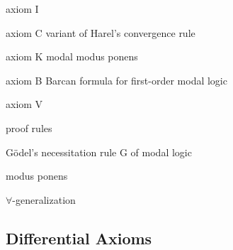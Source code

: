     axiom I

    axiom C
    variant of Harel's convergence rule

    axiom K
    modal modus ponens

    axiom B
    Barcan formula for first-order modal logic

    axiom V

    proof rules

    Gödel's necessitation rule G of modal logic

    modus ponens

    $\forall$-generalization


    \subsection{Differential Axioms}
        \label{sec:differential-axioms}

        \begin{calculus}
            \cinferenceRule[]{}{
                \D{} =
            }{}
            \cinferenceRule[]{}{
                \D{} =
            }{}
            \cinferenceRule[]{}{
                \D{} =
            }{}
        \end{calculus}
    
        \begin{calculus}

        
        \end{calculus}

